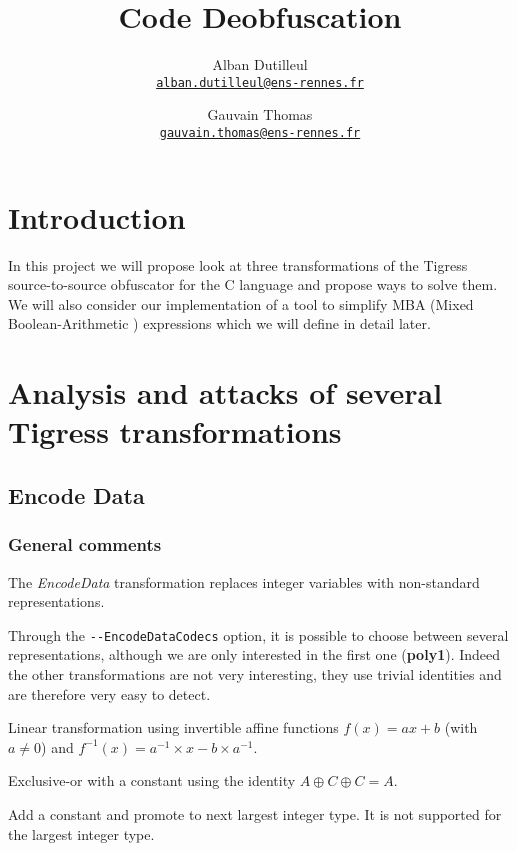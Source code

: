 \documentclass{projectreport}
\title{Code Deobfuscation}
\author{
  Alban Dutilleul\\
  \texttt{\href{mailto:alban.dutilleul@ens-rennes.fr}{alban.dutilleul@ens-rennes.fr}}
  \and
  Gauvain Thomas\\
  \texttt{\href{mailto:gauvain.thomas@ens-rennes.fr}{gauvain.thomas@ens-rennes.fr}}
}
\begin{document}

\maketitle


\section{Introduction}

In this project we will propose look at three transformations of the Tigress source-to-source obfuscator for the C language and propose ways to solve them. We will also consider our implementation of a tool to simplify \textsf{MBA} (Mixed Boolean-Arithmetic ) expressions which we will define in detail later.

\section{Analysis and attacks of several Tigress transformations}

\subsection{Encode Data}
\subsubsection{General comments}
The \textit{EncodeData} transformation replaces integer variables with non-standard representations. 

Through the \verb|--EncodeDataCodecs| option, it is possible to choose between several representations, although we are only interested in the first one (\textbf{\textsf{poly1}}).
Indeed the other transformations are not very interesting, they use trivial identities and are therefore very easy to detect.

\begin{description}[font=\sffamily\bfseries, leftmargin=1cm, style=nextline]
  \item[poly1]
    Linear transformation using invertible affine functions $f(x) = ax +b$ (with $a \neq  0$) and $f^{-1}(x) = a^{-1} \times x - b \times a^{-1}$.
  \item[xor]
    Exclusive-or with a constant using the identity $A \oplus C \oplus C = A$.
  \item[add]
    Add a constant and promote to next largest integer type. It is not supported for the largest integer type. 
\end{description}
\end{document}
